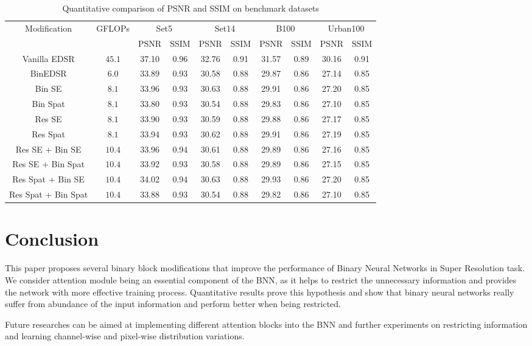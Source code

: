 \documentclass{article}
\begin{document}
\begin{table}[]
    \centering
    \begin{tabular}{ |c|c|c|c|c|c|c|c|c|c| } 
     \hline
      \multirow{2}{*}{Modification} & \multirow{2}{*}{GFLOPs} & \multicolumn{2}{c}{Set5} & \multicolumn{2}{c}{Set14} & \multicolumn{2}{c}{B100} & \multicolumn{2}{c}{Urban100}\\ 
      & & PSNR & SSIM & PSNR & SSIM & PSNR & SSIM & PSNR & SSIM\\ 
      Vanilla EDSR & $45.1$ & 37.10 &  0.96 & 32.76 & 0.91 & 31.57 & 0.89 & 30.16 & 0.91 \\ 
      BinEDSR & $6.0$ & 33.89 & 0.93 & 30.58 & 0.88 & 29.87 & 0.86 & 27.14 & 0.85 \\ 
      Bin SE & $8.1$ & 33.96 & 0.93 & 30.63 & 0.88 & 29.91 & 0.86 & 27.20 & 0.85 \\ 
      Bin Spat & $8.1$ & 33.80 & 0.93 & 30.54 & 0.88 & 29.83 & 0.86 & 27.10 & 0.85 \\ 
      Res SE & $8.1$ & 33.90 & 0.93 & 30.59 & 0.88 & 29.88 & 0.86 & 27.17 & 0.85 \\ 
      Res Spat & $8.1$ & 33.94 & 0.93 & 30.62 & 0.88 & 29.91 & 0.86 & 27.19 & 0.85 \\ 
      Res SE + Bin SE & $10.4$ & 33.96 & 0.94 & 30.61 & 0.88 & 29.89 & 0.86 & 27.16 & 0.85 \\ 
      Res SE + Bin Spat & $10.4$ & 33.92 & 0.93 & 30.58 & 0.88 & 29.89 & 0.86 & 27.15 & 0.85 \\ 
      Res Spat + Bin SE & $10.4$ & 34.02 & 0.94 & 30.63 & 0.88 & 29.93 & 0.86 & 27.20 & 0.85 \\ 
      Res Spat + Bin Spat & $10.4$ & 33.88 & 0.93 & 30.54 & 0.88 & 29.82 & 0.86 & 27.10 & 0.85 \\ 
     \hline
    \end{tabular}
    \caption{Quantitative comparison of PSNR and SSIM on benchmark datasets}
    \label{tab:metric_tab}
\end{table}

\clearpage
\section{Conclusion}
This paper proposes several binary block modifications that improve the performance of Binary Neural Networks in Super Resolution task. We consider attention module being an essential component of the BNN, as it helps to restrict the unnecessary information and provides the network with more effective training process. Quantitative results prove this hypothesis and show that binary neural networks really suffer from abundance of the input information and perform better when being restricted. 

Future researches can be aimed at implementing different attention blocks into the BNN and further experiments on restricting information and learning channel-wise and pixel-wise distribution variations.



\end{document}
